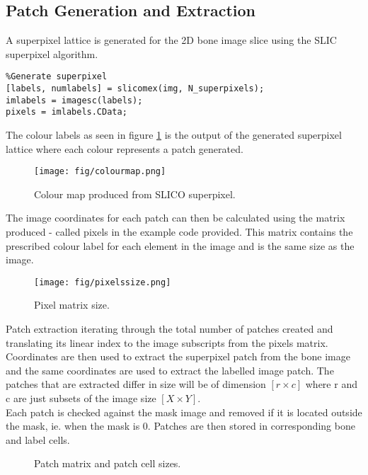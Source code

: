 \subsection{Patch Generation and Extraction}
A superpixel lattice is generated for the 2D bone image slice using the SLIC superpixel algorithm. 

\begin{lstlisting}
%Generate superpixel
[labels, numlabels] = slicomex(img, N_superpixels);
imlabels = imagesc(labels);
pixels = imlabels.CData;
\end{lstlisting}
\bigskip

The colour labels as seen in figure \ref{fig:colourmap} is the output of the generated superpixel lattice where each colour represents a patch generated. 

\begin{figure}[H]
\centering
\texttt{[image: fig/colourmap.png]}
\caption{Colour map produced from SLICO superpixel.}
\label{fig:colourmap}
\end{figure}

The image coordinates for each patch can then be calculated using the matrix produced - called pixels in the example code provided. This matrix contains the prescribed colour label for each element in the image and is the same size as the image.

\begin{figure}[H]
\centering
\texttt{[image: fig/pixelssize.png]}
\caption{Pixel matrix size.}
\label{mat: pixel}
\end{figure}


Patch extraction iterating through the total number of patches created and translating its linear index to the image subscripts from the pixels matrix. Coordinates are then used to extract the superpixel patch from the bone image and the same coordinates are used to extract the labelled image patch. The patches that are extracted differ in size will be of dimension $[r \times c]$ where r and c are just subsets of the image size $[X \times Y]$.
\\[1\baselineskip]
Each patch is checked against the mask image and removed if it is located outside the mask, ie. when the mask is 0. Patches are then stored in corresponding bone and label cells.

\begin{figure}[H]
    \centering
    \qquad
    \caption{Patch matrix and patch cell sizes.}%
    \label{mat:patch_cell}
\end{figure}


